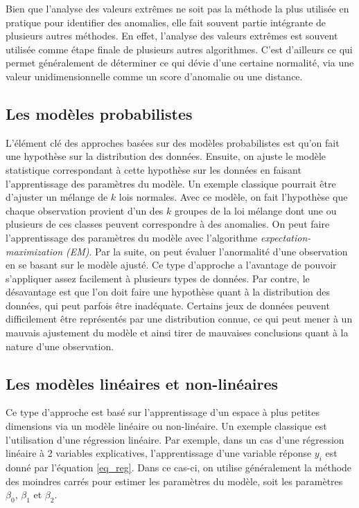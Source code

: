 Bien que l'analyse des valeurs extrêmes ne soit pas la méthode la plus utilisée en pratique pour identifier des anomalies, elle fait souvent partie intégrante de plusieurs autres méthodes. En effet, l'analyse des valeurs extrêmes est souvent utilisée comme étape finale de plusieurs autres algorithmes. C'est d'ailleurs ce qui permet généralement de déterminer ce qui dévie d'une certaine normalité, via une valeur unidimensionnelle comme un score d'anomalie ou une distance.


\subsection{Les modèles probabilistes}

L'élément clé des approches basées sur des modèles probabilistes  est qu'on fait une hypothèse sur la distribution des données. Ensuite, on ajuste le modèle statistique correspondant à cette hypothèse sur les données en faisant l'apprentissage des paramètres du modèle. Un exemple classique pourrait être d'ajuster un mélange de $k$ lois normales. Avec ce modèle, on fait l'hypothèse que chaque observation provient d'un des $k$ groupes de la loi mélange dont une ou plusieurs de ces classes peuvent correspondre à des anomalies. On peut faire l'apprentissage des paramètres du modèle avec l'algorithme \textit{expectation-maximization (EM)}. Par la suite, on peut évaluer l'anormalité d'une observation en se basant sur le modèle ajusté. Ce type d'approche a l'avantage de pouvoir s'appliquer assez facilement à plusieurs types de données. Par contre, le désavantage est que l'on doit faire une hypothèse quant à la distribution des données, qui peut parfois être inadéquate. Certains jeux de données peuvent difficilement être représentés par une distribution connue, ce qui peut mener à un mauvais ajustement du modèle et ainsi tirer de mauvaises conclusions quant à la nature d'une observation.

\subsection{Les modèles linéaires et non-linéaires} \label{soussec:linear}

Ce type d'approche est basé sur l'apprentissage d'un espace à plus petites dimensions via un modèle linéaire ou non-linéaire. Un exemple classique est l'utilisation d'une régression linéaire. Par exemple, dans un cas d'une régression linéaire à 2 variables explicatives, l'apprentissage d'une variable réponse $y_i$ est donné par l'équation \ref{eq_reg}. Dans ce cas-ci, on utilise généralement la méthode des moindres carrés pour estimer les paramètres du modèle, soit les paramètres $\beta_0$, $\beta_1$ et $\beta_2$.

